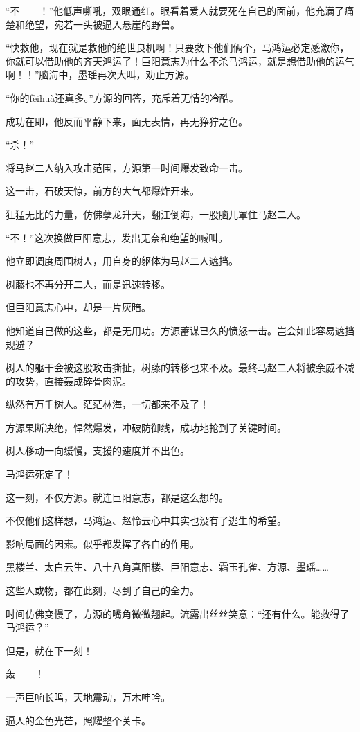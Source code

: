 \begin{this_body}
“不——！”他低声嘶吼，双眼通红。眼看着爱人就要死在自己的面前，他充满了痛楚和绝望，宛若一头被逼入悬崖的野兽。

“快救他，现在就是救他的绝世良机啊！只要救下他们俩个，马鸿运必定感激你，你就可以借助他的齐天鸿运了！巨阳意志为什么不杀马鸿运，就是想借助他的运气啊！！”脑海中，墨瑶再次大叫，劝止方源。

“你的fèihuà还真多。”方源的回答，充斥着无情的冷酷。

成功在即，他反而平静下来，面无表情，再无狰狞之色。

“杀！”

将马赵二人纳入攻击范围，方源第一时间爆发致命一击。

这一击，石破天惊，前方的大气都爆炸开来。

狂猛无比的力量，仿佛孽龙升天，翻江倒海，一股脑儿罩住马赵二人。

“不！”这次换做巨阳意志，发出无奈和绝望的喊叫。

他立即调度周围树人，用自身的躯体为马赵二人遮挡。

树藤也不再分开二人，而是迅速转移。

但巨阳意志心中，却是一片灰暗。

他知道自己做的这些，都是无用功。方源蓄谋已久的愤怒一击。岂会如此容易遮挡规避？

树人的躯干会被这股攻击撕扯，树藤的转移也来不及。最终马赵二人将被余威不减的攻势，直接轰成碎骨肉泥。

纵然有万千树人。茫茫林海，一切都来不及了！

方源果断决绝，悍然爆发，冲破防御线，成功地抢到了关键时间。

树人移动一向缓慢，支援的速度并不出色。

马鸿运死定了！

这一刻，不仅方源。就连巨阳意志，都是这么想的。

不仅他们这样想，马鸿运、赵怜云心中其实也没有了逃生的希望。

影响局面的因素。似乎都发挥了各自的作用。

黑楼兰、太白云生、八十八角真阳楼、巨阳意志、霜玉孔雀、方源、墨瑶……

这些人或物，都在此刻，尽到了自己的全力。

时间仿佛变慢了，方源的嘴角微微翘起。流露出丝丝笑意：“还有什么。能救得了马鸿运？”

但是，就在下一刻！

轰——！

一声巨响长鸣，天地震动，万木呻吟。

逼人的金色光芒，照耀整个关卡。


\end{this_body}
